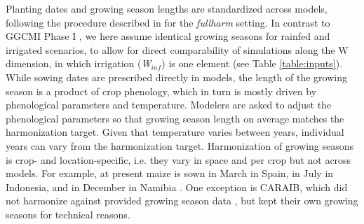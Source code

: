 \documentclass[gmd, manuscript]{copernicus} %
\begin{document}
Planting dates and growing season lengths are standardized across models, following the procedure described in \citet{Elliott2015} for the \textit{fullharm} setting. In contrast to GGCMI Phase I \citep{Elliott2015}, we here assume identical growing seasons for rainfed and irrigated scenarios, to allow for direct comparability of simulations along the W dimension, in which irrigation (\textit{W$_{inf}$}) is one element (see Table \ref{table:inputs}). 
While sowing dates are prescribed directly in models, the length of the growing season is a product of crop phenology, which in turn is mostly driven by phenological parameters and temperature. Modelers are asked to adjust the phenological parameters so that growing season length on average matches the harmonization target. Given that temperature varies between years, individual years can vary from the harmonization target.
Harmonization of growing seasons is crop- and location-specific, i.e. they vary in space and per crop but not across models. 
For example, at present maize is sown in March in Spain, in July in Indonesia, and in December in Namibia \citep{Portmann2010}.
One exception is CARAIB, which did not harmonize against provided growing season data \citep{Elliott2015}, but kept their own growing seasons for technical reasons.
 
\end{document}
